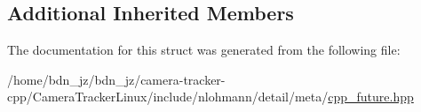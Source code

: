 \subsection*{Additional Inherited Members}


The documentation for this struct was generated from the following file\+:\begin{DoxyCompactItemize}
\item 
/home/bdn\+\_\+jz/bdn\+\_\+jz/camera-\/tracker-\/cpp/\+Camera\+Tracker\+Linux/include/nlohmann/detail/meta/\hyperlink{cpp__future_8hpp}{cpp\+\_\+future.\+hpp}\end{DoxyCompactItemize}
